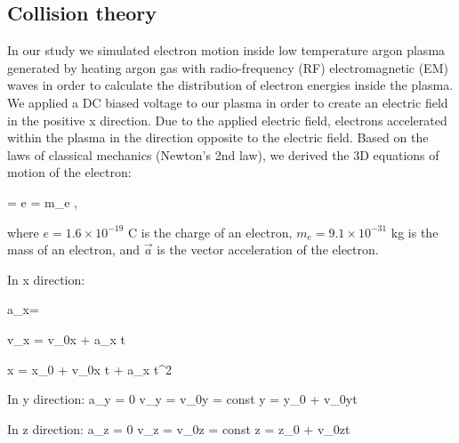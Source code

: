 \documentclass[12pt]{article}
\begin{document}
\subsection{Collision theory}

In our study we simulated electron motion inside low temperature argon plasma generated by heating argon gas with radio-frequency (RF) electromagnetic (EM) waves in order to calculate the distribution of electron energies inside the plasma. We applied a DC biased voltage to our plasma in order to create an electric field in the positive x direction. 
Due to the applied electric field, electrons accelerated within the plasma in the direction opposite to the electric field. Based on the laws of classical mechanics (Newton’s 2nd law), we derived the 3D equations of motion of the electron:

\beqn
{} = e = m_{e} ,
\label{Newtons 2nd law}
\eeqn

where $e = 1.6\times10^{-19}$ C is the charge of an electron, $m_{e} = 9.1\times10^{-31}$ kg is the mass of an electron, and $\vec{a}$ is the vector acceleration of the electron.

In x direction:

\beqn
a_x= 
\label{ForceChargeField}
\eeqn

\beqn
v_x = v_{0x} + a_x t
\label{Initial VelocityX}
\eeqn

\beqn
x = x_0 + v_{0x} t +  a_x t^2
\label{Initial Position}
\eeqn

In y direction:
\beqn
a_y = 0 \rightarrow v_y = v_{0y} = const \rightarrow y = y_0 + v_{0y}t
\label{Initial VelocityY}
\eeqn

In z direction:
\beqn
a_z = 0 \rightarrow v_z = v_{0z} = const \rightarrow z = z_0 + v_{0z}t
\label{Initial VelocityZ}
\eeqn
\end{document}
